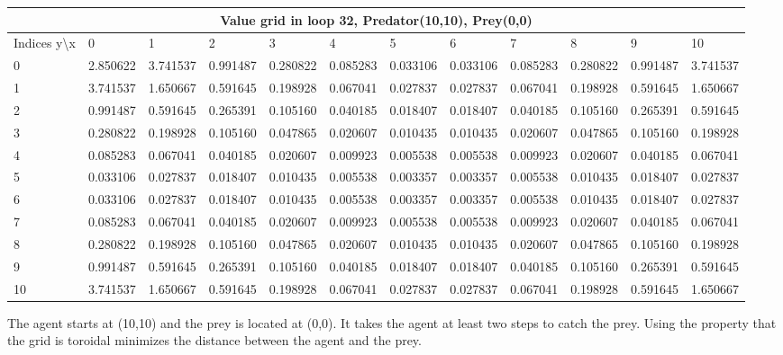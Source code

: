 \documentclass{article}
\begin{document}
\begin{center}
\scalebox{0.7}
	{
	\begin{tabular}{ |l | l | l | l | l | l | l | l | l | l | l | l|}
	\hline
	\multicolumn{12}{|c|}{Value grid in loop 32, Predator(10,10), Prey(0,0)}\\
	\hline
	Indices y\textbackslash x &0 & 1 & 2 & 3 & 4 & 5 & 6 & 7 & 8 & 9 & 10 \\ 

\hline
0 & \cellcolor{red!40} 2.850622 & 3.741537 & 0.991487 & 0.280822 & 0.085283 & 0.033106 & 0.033106 & 0.085283 & 0.280822 & 0.991487 & 3.741537 \\
1 & 3.741537 & 1.650667 & 0.591645 & 0.198928 & 0.067041 & 0.027837 & 0.027837 & 0.067041 & 0.198928 & 0.591645 & 1.650667 \\
2 & 0.991487 & 0.591645 & 0.265391 & 0.105160 & 0.040185 & 0.018407 & 0.018407 & 0.040185 & 0.105160 & 0.265391 & 0.591645 \\
3 & 0.280822 & 0.198928 & 0.105160 & 0.047865 & 0.020607 & 0.010435 & 0.010435 & 0.020607 & 0.047865 & 0.105160 & 0.198928 \\
4 & 0.085283 & 0.067041 & 0.040185 & 0.020607 & 0.009923 & 0.005538 & 0.005538 & 0.009923 & 0.020607 & 0.040185 & 0.067041 \\
5 & 0.033106 & 0.027837 & 0.018407 & 0.010435 & 0.005538 & 0.003357 & 0.003357 & 0.005538 & 0.010435 & 0.018407 & 0.027837 \\
6 & 0.033106 & 0.027837 & 0.018407 & 0.010435 & 0.005538 & 0.003357 & 0.003357 & 0.005538 & 0.010435 & 0.018407 & 0.027837 \\
7 & 0.085283 & 0.067041 & 0.040185 & 0.020607 & 0.009923 & 0.005538 & 0.005538 & 0.009923 & 0.020607 & 0.040185 & 0.067041 \\
8 & 0.280822 & 0.198928 & 0.105160 & 0.047865 & 0.020607 & 0.010435 & 0.010435 & 0.020607 & 0.047865 & 0.105160 & 0.198928 \\
9 & 0.991487 & 0.591645 & 0.265391 & 0.105160 & 0.040185 & 0.018407 & 0.018407 & 0.040185 & 0.105160 & 0.265391 & 0.591645 \\
10 & 3.741537 & 1.650667 & 0.591645 & 0.198928 & 0.067041 & 0.027837 & 0.027837 & 0.067041 & 0.198928 & 0.591645 & \cellcolor{green!40}1.650667 \\

\hline
	\end{tabular}
	}
\end{center}

The agent starts at (10,10) and the prey is located at (0,0). It takes the agent at least two steps to catch the prey. Using the property that the grid is toroidal minimizes the distance between the agent and the prey. 
\fi
\end{document}
